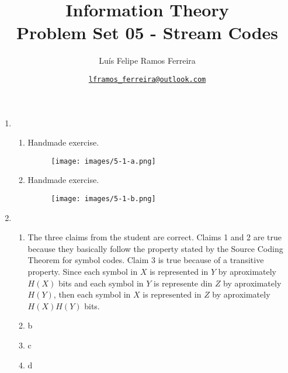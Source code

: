 \documentclass{article}
\title{Information Theory \\ \large Problem Set 05 - Stream Codes}
\author{Luís Felipe Ramos Ferreira}
\date{\href{mailto:lframos\_ferreira@outlook.com}{\texttt{lframos\_ferreira@outlook.com}}
}
\begin{document}
\maketitle

\begin{enumerate}
	\item \begin{enumerate}
		      \item Handmade exercise.
		            \begin{figure}[H]
			            \centering
			            \texttt{[image: images/5-1-a.png]}
		            \end{figure}

		      \item Handmade exercise.
		            \begin{figure}[H]
			            \centering
			            \texttt{[image: images/5-1-b.png]}
		            \end{figure}
	      \end{enumerate}
	\item \begin{enumerate}
		      \item The three claims from the student are correct. Claims 1 and 2 are true because they basically follow the property stated by the Source Coding Theorem for symbol codes. Claim 3 is true because of a transitive property. Since each symbol in \(X\) is represented in \(Y\) by aproximately \(H(X)\) bits and each symbol in \(Y\) is represente din \(Z\) by aproximately \(H(Y)\), then each symbol in \(X\) is represented in \(Z\) by aproximately \(H(X) H(Y)\) bits.
		      \item b
		      \item c
		      \item d
	      \end{enumerate}
\end{enumerate}
\end{document}
